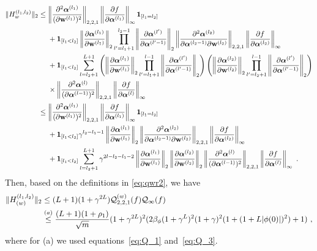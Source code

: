 \begin{align*}
\| H_{w}^{(l_1,l_2)} \|_2 
& \leq  \left\| \frac{\partial^2 \boldsymbol{\alpha}^{(l_1)}}{(\partial \mathbf{w}^{(l_1)})^2} \right\|_{2,2,1} \left\| \frac{\partial f}{\partial \boldsymbol{\alpha}^{(l_1)}} \right\|_{\infty} \bm{1}_{[l_1=l_2]}\\
& ~~~~ + \bm{1}_{[l_1 <l_2]} \left\| \frac{\partial \boldsymbol{\alpha}^{(l_1)}}{\partial \mathbf{w}^{(l_1)}} \right\|_2 \prod_{l'=l_1+1}^{l_2-1} \left\| \frac{\partial \boldsymbol{\alpha}^{(l')}}{\partial \boldsymbol{\alpha}^{(l'-1)}} \right\|_2 \left\| \frac{\partial^2 \boldsymbol{\alpha}^{(l_2)}}{\partial \boldsymbol{\alpha}^{(l_2-1)} \partial \mathbf{w}^{(l_2)}} \right\|_{2,2,1} \left\| \frac{\partial f}{\partial \boldsymbol{\alpha}^{(l_2)}} \right\|_{\infty} \\
& ~~~~ + \bm{1}_{[l_1 <l_2]}\sum_{l=l_2+1}^{L+1} \left( \left\| \frac{\partial \boldsymbol{\alpha}^{(l_1)}}{\partial \mathbf{w}^{(l_1)}} \right\|_2  \prod_{l'=l_1+1}^{l-1} \left\| \frac{\partial \boldsymbol{\alpha}^{(l')}}{\partial \boldsymbol{\alpha}^{(l'-1)}} \right\|_2 \right)  \left( \left\| \frac{\partial \boldsymbol{\alpha}^{(l_2)}}{\partial \mathbf{w}^{(l_2)}} \right\|_2 \prod_{l'=l_2+1}^{l-1} \left\| \frac{\partial \boldsymbol{\alpha}^{(l')}}{\partial \boldsymbol{\alpha}^{(l'-1)}} \right\|_{2} \right)\\
& ~~~~ \times\left\| \frac{\partial^2 \boldsymbol{\alpha}^{(l)}}{(\partial \boldsymbol{\alpha}^{(l-1)})^2} \right\|_{2,2,1} \left\| \frac{\partial f}{\partial \boldsymbol{\alpha}^{(l)}} \right\|_{\infty} \\
& \leq  \left\| \frac{\partial^2 \boldsymbol{\alpha}^{(l_1)}}{(\partial \mathbf{w}^{(l_1)})^2} \right\|_{2,2,1} \left\| \frac{\partial f}{\partial \boldsymbol{\alpha}^{(l_1)}} \right\|_{\infty}\bm{1}_{[l_1=l_2]}\\
& ~~~~ +  \bm{1}_{[l_1 <l_2]}\gamma^{l_2-l_1-1} \left\| \frac{\partial \boldsymbol{\alpha}^{(l_1)}}{\partial \mathbf{w}^{(l_1)}} \right\|_2 \left\| \frac{\partial^2 \boldsymbol{\alpha}^{(l_2)}}{\partial \boldsymbol{\alpha}^{(l_2-1)} \partial \mathbf{w}^{(l_2)}} \right\|_{2,2,1} \left\| \frac{\partial f}{\partial \boldsymbol{\alpha}^{(l_2)}} \right\|_{\infty} \\
& ~~~~ + \bm{1}_{[l_1 <l_2]}\sum_{l=l_2+1}^{L+1} \gamma^{2l - l_2 - l_1-2} \left\| \frac{\partial \boldsymbol{\alpha}^{(l_1)}}{\partial \mathbf{w}^{(l_1)}} \right\|_2  \left\| \frac{\partial \boldsymbol{\alpha}^{(l_2)}}{\partial \mathbf{w}^{(l_2)}} \right\|_2  \left\| \frac{\partial^2 \boldsymbol{\alpha}^{(l)}}{(\partial \boldsymbol{\alpha}^{(l-1)})^2} \right\|_{2,2,1} \left\| \frac{\partial f}{\partial \boldsymbol{\alpha}^{(l)}} \right\|_{\infty}~.
\end{align*}
Then, based on the definitions in \eqref{eq:qwr2}, we have
\begin{align*}
 \| H_{(w)}^{(l_1,l_2)} \|_2 &\leq (L+1)(1+\gamma^{2L}) {\cal Q}^{(w)}_{2,2,1}(f) {\cal Q}_{\infty}(f)\\
 &\overset{(a)}{\leq}
 \frac{(L+1)(1+\rho_1)}{\sqrt{m}}(1+\gamma^{2L})^2(2\beta_{\phi}(1+\gamma^L)^2(1+\gamma)^2(1+(1+L|\phi(0)|)^2)+1)
 ~,
\end{align*}
where for (a) we used equations~\eqref{eq:Q_1} and~\eqref{eq:Q_3}.


